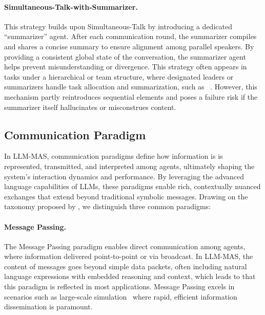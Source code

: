 \paragraph{Simultaneous-Talk-with-Summarizer.} This strategy builds upon Simultaneous-Talk by introducing a dedicated “summarizer” agent. After each communication round, the summarizer compiles and shares a concise summary to ensure alignment among parallel speakers. By providing a consistent global state of the conversation, the summarizer agent helps prevent misunderstanding or divergence. This strategy often appears in tasks under a hierarchical or team structure, where designated leaders or summarizers handle task allocation and summarization, such as ~\cite{casualgpt_reasoning,social_media_regulation,agentcoord,polca_mas_for_political}. However, this mechanism partly reintroduces sequential elements and poses a failure risk if the summarizer itself hallucinates or misconstrues content.

\subsection{Communication Paradigm}
In LLM-MAS, communication paradigms define how information is is represented, transmitted, and interpreted among agents, ultimately shaping the system’s interaction dynamics and performance. By leveraging the advanced language capabilities of LLMs, these paradigms enable rich, contextually nuanced exchanges that extend beyond traditional symbolic messages. Drawing on the taxonomy proposed by \cite{mas_a_survey}, we distinguish three common paradigms:

\paragraph{Message Passing.} The Message Passing paradigm enables direct communication among agents, where information delivered point-to-point or via broadcast. In LLM-MAS, the content of messages goes beyond simple data packets, often including natural language expressions with embedded reasoning and context, which leads to that this paradigm is reflected in most applications. Message Passing excels in scenarios such as large-scale simulation~\cite{simulating_opinion_dynamic} where rapid, efficient information dissemination is paramount.


